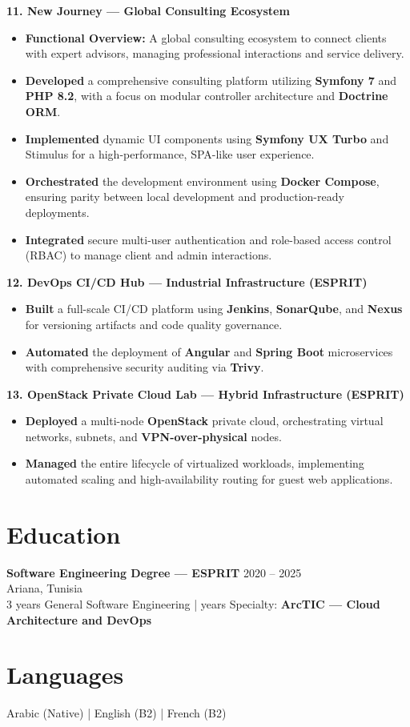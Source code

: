 \documentclass[10pt, letterpaper]{article}
\newenvironment{highlights}{
\begin{itemize}[leftmargin=12pt, itemsep=2pt]
}{
\end{itemize}
}
\begin{document}
\textbf{11. New Journey --- Global Consulting Ecosystem}
\begin{highlights}
\item \textbf{Functional Overview:} A global consulting ecosystem to connect clients with expert advisors, managing professional interactions and service delivery.
\item \textbf{Developed} a comprehensive consulting platform utilizing \textbf{Symfony 7} and \textbf{PHP 8.2}, with a focus on modular controller architecture and \textbf{Doctrine ORM}.
\item \textbf{Implemented} dynamic UI components using \textbf{Symfony UX Turbo} and Stimulus for a high-performance, SPA-like user experience.
\item \textbf{Orchestrated} the development environment using \textbf{Docker Compose}, ensuring parity between local development and production-ready deployments.
\item \textbf{Integrated} secure multi-user authentication and role-based access control (RBAC) to manage client and admin interactions.
\end{highlights}

\textbf{12. DevOps CI/CD Hub --- Industrial Infrastructure (ESPRIT)}
\begin{highlights}
\item \textbf{Built} a full-scale CI/CD platform using \textbf{Jenkins}, \textbf{SonarQube}, and \textbf{Nexus} for versioning artifacts and code quality governance.
\item \textbf{Automated} the deployment of \textbf{Angular} and \textbf{Spring Boot} microservices with comprehensive security auditing via \textbf{Trivy}.
\end{highlights}

\textbf{13. OpenStack Private Cloud Lab --- Hybrid Infrastructure (ESPRIT)}
\begin{highlights}
\item \textbf{Deployed} a multi-node \textbf{OpenStack} private cloud, orchestrating virtual networks, subnets, and \textbf{VPN-over-physical} nodes.
\item \textbf{Managed} the entire lifecycle of virtualized workloads, implementing automated scaling and high-availability routing for guest web applications.
\end{highlights}

\section{Education}
\textbf{Software Engineering Degree --- ESPRIT} \hfill 2020 -- 2025 \\
Ariana, Tunisia \\
3 years General Software Engineering \;| years Specialty: \textbf{ArcTIC --- Cloud Architecture and DevOps}

\section{Languages}
Arabic (Native) \;|\; English (B2) \;|\; French (B2)
\end{document}
